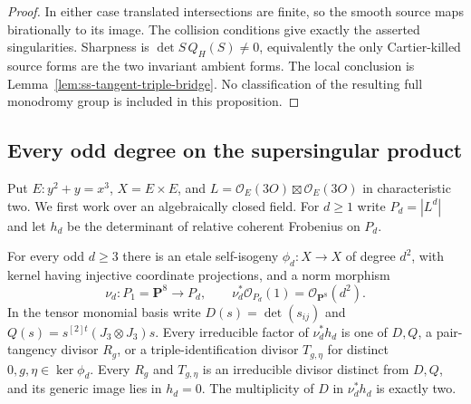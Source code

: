 \begin{proof}
In either case translated intersections are finite, so the smooth
source maps birationally to its image. The collision conditions
give exactly the asserted singularities. Sharpness is
$\det S\,Q_H(S)\ne0$, equivalently the only Cartier-killed source
forms are the two invariant ambient forms. The local conclusion
is Lemma~\ref{lem:ss-tangent-triple-bridge}. No classification of
the resulting full monodromy group is included in this proposition.
\end{proof}


\subsection{Every odd degree on the supersingular product}
\label{subsec:ss-all-odd-groups}

Put $E:y^2+y=x^3$, $X=E\times E$, and
$L=\mathcal O_E(3O)\boxtimes\mathcal O_E(3O)$ in characteristic two.
We first work over an algebraically closed field.
For $d\ge1$ write $P_d=|L^d|$ and let $h_d$ be the determinant of
relative coherent Frobenius on $P_d$.

\begin{lemma}
\label{lem:ss-all-odd-norm-factors}
For every odd $d\ge3$ there is an etale self-isogeny
$\phi_d:X\to X$ of degree $d^2$, with kernel having injective
coordinate projections, and a norm morphism
\[
 \nu_d:P_1=\mathbf P^8\longrightarrow P_d,
 \qquad \nu_d^*\mathcal O_{P_d}(1)=\mathcal O_{\mathbf P^8}(d^2).
\]
In the tensor monomial basis write
$D(s)=\det(s_{ij})$ and
$Q(s)=s^{[2]t}(J_3\otimes J_3)s$.
Every irreducible factor of $\nu_d^*h_d$ is one of $D,Q$, a
pair-tangency divisor $R_g$, or a triple-identification divisor
$T_{g,\eta}$ for distinct $0,g,\eta\in\ker\phi_d$.
Every $R_g$ and $T_{g,\eta}$ is an irreducible divisor distinct
from $D,Q$, and its generic image lies in $h_d=0$.
The multiplicity of $D$ in $\nu_d^*h_d$ is exactly two.
\end{lemma}

